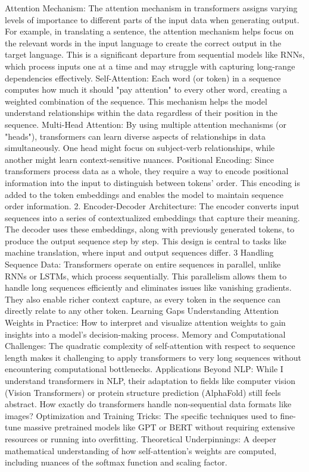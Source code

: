 \documentclass{article}
\begin{document}
Attention Mechanism:
The attention mechanism in transformers assigns varying levels of importance to different parts of the input data when generating output. For example, in translating a sentence, the attention mechanism helps focus on the relevant words in the input language to create the correct output in the target language. This is a significant departure from sequential models like RNNs, which process inputs one at a time and may struggle with capturing long-range dependencies effectively.
Self-Attention:
Each word (or token) in a sequence computes how much it should "pay attention" to every other word, creating a weighted combination of the sequence. This mechanism helps the model understand relationships within the data regardless of their position in the sequence.
Multi-Head Attention:
By using multiple attention mechanisms (or "heads"), transformers can learn diverse aspects of relationships in data simultaneously. One head might focus on subject-verb relationships, while another might learn context-sensitive nuances.
Positional Encoding:
Since transformers process data as a whole, they require a way to encode positional information into the input to distinguish between tokens' order. This encoding is added to the token embeddings and enables the model to maintain sequence order information.
2. Encoder-Decoder Architecture:
The encoder converts input sequences into a series of contextualized embeddings that capture their meaning.
The decoder uses these embeddings, along with previously generated tokens, to produce the output sequence step by step.
This design is central to tasks like machine translation, where input and output sequences differ.
3 Handling Sequence Data:
Transformers operate on entire sequences in parallel, unlike RNNs or LSTMs, which process sequentially. This parallelism allows them to handle long sequences efficiently and eliminates issues like vanishing gradients. They also enable richer context capture, as every token in the sequence can directly relate to any other token.
Learning Gaps
Understanding Attention Weights in Practice: How to interpret and visualize attention weights to gain insights into a model’s decision-making process.
Memory and Computational Challenges:
The quadratic complexity of self-attention with respect to sequence length makes it challenging to apply transformers to very long sequences without encountering computational bottlenecks.
Applications Beyond NLP:
While I understand transformers in NLP, their adaptation to fields like computer vision (Vision Transformers) or protein structure prediction (AlphaFold) still feels abstract. How exactly do transformers handle non-sequential data formats like images?
Optimization and Training Tricks:
The specific techniques used to fine-tune massive pretrained models like GPT or BERT without requiring extensive resources or running into overfitting.
Theoretical Underpinnings:
A deeper mathematical understanding of how self-attention’s weights are computed, including nuances of the softmax function and scaling factor.
\end{document}
